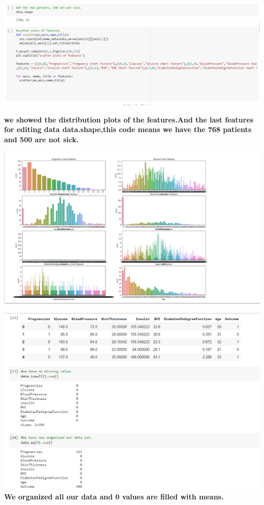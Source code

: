 \documentclass[onecolumn]{article}
\begin{document}
\begin{center}
    

   \includegraphics[scale=2,width=.9\linewidth]{scatter.png}

    \textbf{we showed the distribution plots of the features.And the last features for editing data data.shape,this code means we have the 768 patients and 500 are not sick.}\\
\end{center}

\begin{center}
    

   \includegraphics[scale=2,width=.9\linewidth]{image.png}

\end{center}

\begin{center}
    

   \includegraphics[scale=2,width=1.1\linewidth]{final.png}
    \textbf {We organized all our data and 0 values are filled with means.}

\end{center}
\end{document}
